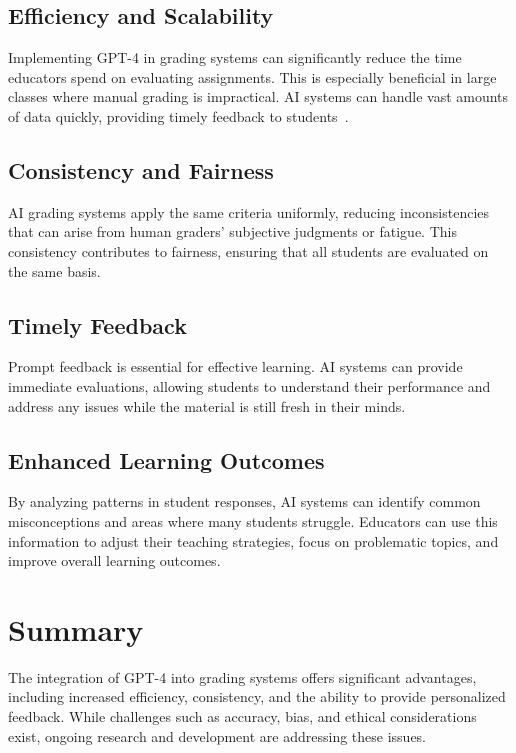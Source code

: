 \documentclass[ms,twoside,print]{nuthesis}
\begin{document}
\subsection{Efficiency and Scalability}

Implementing GPT-4 in grading systems can significantly reduce the time educators spend on evaluating assignments. This is especially beneficial in large classes where manual grading is impractical. AI systems can handle vast amounts of data quickly, providing timely feedback to students~\cite{Alto2023}.

\subsection{Consistency and Fairness}

AI grading systems apply the same criteria uniformly, reducing inconsistencies that can arise from human graders' subjective judgments or fatigue. This consistency contributes to fairness, ensuring that all students are evaluated on the same basis.

\subsection{Timely Feedback}

Prompt feedback is essential for effective learning. AI systems can provide immediate evaluations, allowing students to understand their performance and address any issues while the material is still fresh in their minds.

\subsection{Enhanced Learning Outcomes}

By analyzing patterns in student responses, AI systems can identify common misconceptions and areas where many students struggle. Educators can use this information to adjust their teaching strategies, focus on problematic topics, and improve overall learning outcomes.

\section{Summary}

The integration of GPT-4 into grading systems offers significant advantages, including increased efficiency, consistency, and the ability to provide personalized feedback. While challenges such as accuracy, bias, and ethical considerations exist, ongoing research and development are addressing these issues.
\end{document}
